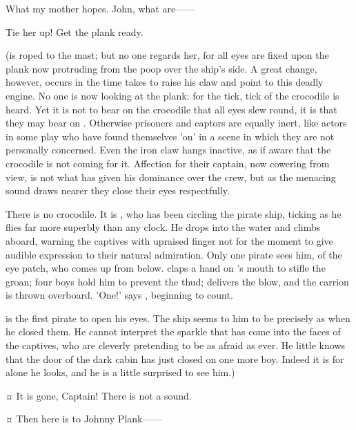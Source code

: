 \begin{drama}
\firsttwinspeaks
What my mother hopes.
John, what are——

\hookspeaks
Tie her up!
Get the plank ready.

\begin{stagedir}
(\wendy is roped to the mast;
but no one regards her, for all eyes are fixed upon the plank now protruding from the poop over the ship's side.
A great change, however, occurs in the time \hook takes to raise his claw and point to this deadly engine.
No one is now looking at the plank: for the tick, tick of the crocodile is heard.
Yet it is not to bear on the crocodile that all eyes slew round, it is that they may bear on \hook.
Otherwise prisoners and captors are equally inert,
like actors in some play who have found themselves 'on' in a scene in which they are not personally concerned.
Even the iron claw hangs inactive, as if aware that the crocodile is not coming for it.
Affection for their captain, now cowering from view, is not what has given \hook his dominance over the crew,
but as the menacing sound draws nearer they close their eyes respectfully.

There is no crocodile.
It is \peter, who has been circling the pirate ship, ticking as he flies far more superbly than any clock.
He drops into the water and climbs aboard, warning the captives with upraised finger 
not for the moment to give audible expression to their natural admiration.
Only one pirate sees him,  of the eye patch, who comes up from below.
\john claps a hand on 's mouth to stifle the groan;
four boys hold him to prevent the thud;
\peter delivers the blow, and the carrion is thrown overboard.
'One!\@' says \slightly, beginning to count.

\starkey is the first pirate to open his eyes.
The ship seems to him to be precisely as when he closed them.
He cannot interpret the sparkle that has come into the faces of the captives,
who are cleverly pretending to be as afraid as ever.
He little knows that the door of the dark cabin has just closed on one more boy.
Indeed it is for \hook alone he looks, and he is a little surprised to see him.)
\end{stagedir}

\starkeyspeaks {}¤
It is gone, Captain!
There is not a sound.


\hookspeaks {}¤
Then here is to Johnny Plank——


\end{drama}
